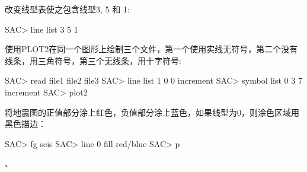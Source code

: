 改变线型表使之包含线型3, 5 和 1:
\begin{SACCode}
SAC> line list 3 5 1
\end{SACCode}

使用PLOT2在同一个图形上绘制三个文件，第一个使用实线无符号，第二个没有线条，用三角符号，第三个无线条，用十字符号:
\begin{SACCode}
SAC> read file1 file2 file3
SAC> line list 1 0 0 increment
SAC> symbol list 0 3 7 increment
SAC> plot2
\end{SACCode}

将地震图的正值部分涂上红色，负值部分涂上蓝色，如果线型为0，则涂色区域用黑色描边：
\begin{SACCode}
SAC> fg seis
SAC> line 0 fill red/blue
SAC> p
\end{SACCode}

、
